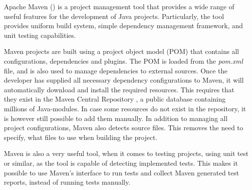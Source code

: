 Apache Maven (\cite{porter_zyl_lamy}) is a project management tool that provides a wide range of useful features for the development of Java projects. Particularly, the tool provides uniform build system, simple dependency management framework, and unit testing capabilities.

Maven projects are built using a project object model (POM) that contains all configurations, dependencies and plugins. The POM is loaded from the \emph{pom.xml} file, and is also used to manage dependencies to external sources.
Once the developer has supplied all necessary dependency configurations to Maven, it will automatically download and install the required resources. This requires that they exist in the Maven Central Repository \cite{mavenDB}, a public database containing millions of Java-modules. In case some resources do not exist in the repository, it is however still possible to add them manually.
In addition to managing all project configurations, Maven also detects source files. This removes the need to specify, what files to use when building the project.

Maven is also a very useful tool, when it comes to testing projects, using unit test or similar, as the tool is capable of detecting implemented tests. This makes it possible to use Maven's interface to run tests and collect Maven generated test reports, instead of running tests manually.


